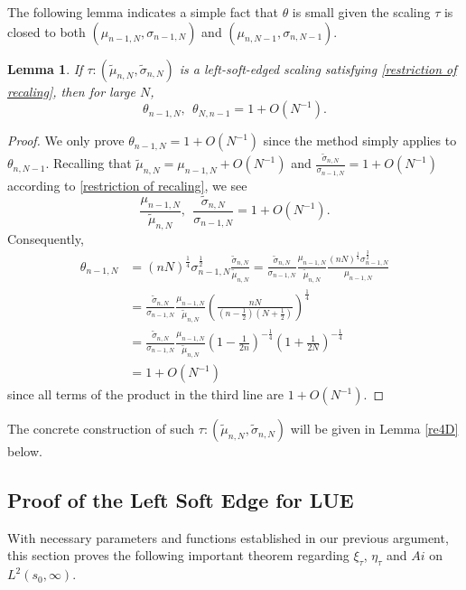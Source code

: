 \documentclass[11pt]{article}
\newtheorem{lemma}[theorem]{Lemma}
\numberwithin{equation}{section}%
\numberwithin{theorem}{section}
\begin{document}
 The following lemma indicates a simple fact that $\theta$ is small given the scaling $\tau$ is closed to both $(\mu_{n-1,N},\sigma_{n-1,N})$ and $(\mu_{n,N-1},\sigma_{n,N-1})$.
 \begin{lemma}\label{order}
    If $\tau:(\tilde{\mu}_{n,N},\tilde{\sigma}_{n,N})$ is a left-soft-edged scaling satisfying \eqref{restriction of recaling}, then for large $N$,
    \begin{equation*}
        \theta_{n-1,N},~~\theta_{N,n-1}=1+O(N^{-1}).
    \end{equation*}
\end{lemma}
\begin{proof}
We only prove $\theta_{n-1,N}=1+O\left(N^{-1}\right)$ since the method simply applies to $\theta_{n,N-1}$. Recalling that $\tilde{\mu}_{n,N}=\mu_{n-1,N}+O\left(N^{-1}\right)$ and $\frac{\tilde{\sigma}_{n,N}}{\sigma_{n-1,N}}=1+O\left(N^{-1}\right)$ according to \eqref{restriction of recaling}, we see
\begin{equation*}
    \frac{\mu_{n-1,N}}{\tilde{\mu}_{n,N}},~~\frac{\tilde{\sigma}_{n,N}}{\sigma_{n-1,N}}=1+O\left(N^{-1}\right).
\end{equation*}
Consequently,
\begin{equation}\label{Deviation1}
    \begin{split}
        \theta_{n-1,N}&=(nN)^\frac{1}{4}\sigma_{n-1,N}^\frac{1}{2}\frac{\tilde{\sigma}_{n,N}}{\tilde{\mu}_{n,N}}=\frac{\tilde{\sigma}_{n,N}}{\sigma_{n-1,N}}\frac{\mu_{n-1,N}}{\tilde{\mu}_{n,N}}\frac{(nN)^\frac{1}{4}\sigma_{n-1,N}^\frac{3}{2}}{\mu_{n-1,N}}\\
        &=\frac{\tilde{\sigma}_{n,N}}{\sigma_{n-1,N}}\frac{\mu_{n-1,N}}{\tilde{\mu}_{n,N}}\left(\frac{nN}{(n-\frac{1}{2})(N+\frac{1}{2})}\right)^\frac{1}{4}\\
        &=\frac{\tilde{\sigma}_{n,N}}{\sigma_{n-1,N}}\frac{\mu_{n-1,N}}{\tilde{\mu}_{n,N}}\left(1-\frac{1}{2n}\right)^{-\frac{1}{4}}\left(1+\frac{1}{2N}\right)^{-\frac{1}{4}}\\
        &=1+O\left(N^{-1}\right)
    \end{split}
\end{equation}
since all terms of the product in the third line are $1+O\left(N^{-1}\right)$.
\end{proof}
The concrete construction of such $\tau:(\tilde{\mu}_{n,N},\tilde{\sigma}_{n,N})$ will be given in Lemma \ref{re4D} below.

\subsection{Proof of the Left Soft Edge for LUE}
With necessary parameters and functions established in our previous argument, this section proves the following important theorem regarding $\xi_\tau$, $\eta_\tau$ and $Ai$ on $L^2(s_0,\infty)$.
\end{document}

